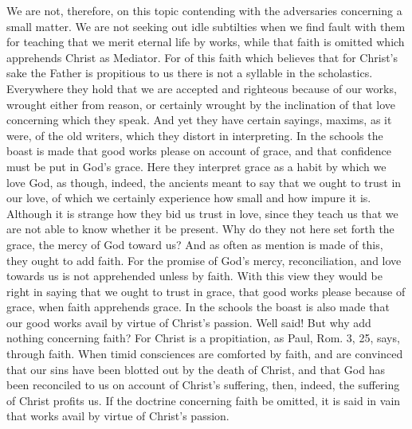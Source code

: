 We are not, therefore, on this topic contending with the adversaries
concerning a small matter.  We are not seeking out idle subtilties
when we find fault with them for teaching that we merit eternal life
by works, while that faith is omitted which apprehends Christ as
Mediator.  For of this faith which believes that for Christ's sake
the Father is propitious to us there is not a syllable in the
scholastics.  Everywhere they hold that we are accepted and righteous
because of our works, wrought either from reason, or certainly
wrought by the inclination of that love concerning which they speak.
And yet they have certain sayings, maxims, as it were, of the old
writers, which they distort in interpreting.  In the schools the
boast is made that good works please on account of grace, and that
confidence must be put in God's grace.  Here they interpret grace as
a habit by which we love God, as though, indeed, the ancients meant
to say that we ought to trust in our love, of which we certainly
experience how small and how impure it is.  Although it is strange
how they bid us trust in love, since they teach us that we are not
able to know whether it be present.  Why do they not here set forth
the grace, the mercy of God toward us?  And as often as mention is
made of this, they ought to add faith.  For the promise of God's
mercy, reconciliation, and love towards us is not apprehended unless
by faith.  With this view they would be right in saying that we ought
to trust in grace, that good works please because of grace, when
faith apprehends grace.  In the schools the boast is also made that
our good works avail by virtue of Christ's passion.  Well said!  But
why add nothing concerning faith?  For Christ is a propitiation, as
Paul, Rom. 3, 25, says, through faith.  When timid consciences are
comforted by faith, and are convinced that our sins have been blotted
out by the death of Christ, and that God has been reconciled to us on
account of Christ's suffering, then, indeed, the suffering of Christ
profits us.  If the doctrine concerning faith be omitted, it is said
in vain that works avail by virtue of Christ's passion.

